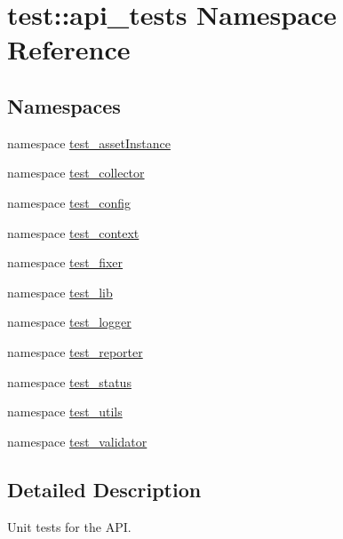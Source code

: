 \hypertarget{namespacetest_1_1api__tests}{\section{test\-:\-:api\-\_\-tests \-Namespace \-Reference}
\label{df/d2b/namespacetest_1_1api__tests}
}
\subsection*{\-Namespaces}
\begin{DoxyCompactItemize}
\item 
namespace \hyperlink{namespacetest_1_1api__tests_1_1test__assetInstance}{test\-\_\-asset\-Instance}
\item 
namespace \hyperlink{namespacetest_1_1api__tests_1_1test__collector}{test\-\_\-collector}
\item 
namespace \hyperlink{namespacetest_1_1api__tests_1_1test__config}{test\-\_\-config}
\item 
namespace \hyperlink{namespacetest_1_1api__tests_1_1test__context}{test\-\_\-context}
\item 
namespace \hyperlink{namespacetest_1_1api__tests_1_1test__fixer}{test\-\_\-fixer}
\item 
namespace \hyperlink{namespacetest_1_1api__tests_1_1test__lib}{test\-\_\-lib}
\item 
namespace \hyperlink{namespacetest_1_1api__tests_1_1test__logger}{test\-\_\-logger}
\item 
namespace \hyperlink{namespacetest_1_1api__tests_1_1test__reporter}{test\-\_\-reporter}
\item 
namespace \hyperlink{namespacetest_1_1api__tests_1_1test__status}{test\-\_\-status}
\item 
namespace \hyperlink{namespacetest_1_1api__tests_1_1test__utils}{test\-\_\-utils}
\item 
namespace \hyperlink{namespacetest_1_1api__tests_1_1test__validator}{test\-\_\-validator}
\end{DoxyCompactItemize}


\subsection{\-Detailed \-Description}
\begin{DoxyVerb}
Unit tests for the API.
\end{DoxyVerb}
 